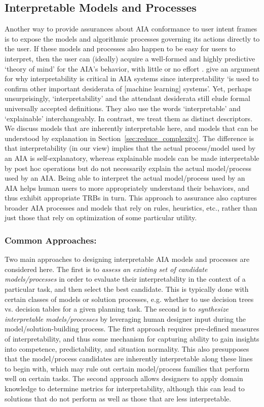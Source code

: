 \subsection{Interpretable Models and Processes} \label{sec:interp_models}
Another way to provide assurances about AIA conformance to user intent frames is to expose the models and algorithmic processes governing its actions directly to the user. If these models and processes also happen to be easy for users to interpret, then the user can (ideally) acquire a well-formed and highly predictive `theory of mind' for the AIA's behavior, with little or no effort . 
\citet{Doshi-Velez2017-xy} give an argument for why interpretability is critical in AIA systems since interpretability `is used to confirm other important desiderata of [machine learning] systems'. 
Yet, perhaps unsurprisingly, `interpretability' and the attendant desiderata still elude formal universally accepted definitions. 
They also use the words `interpretable' and `explainable' interchangeably. In contrast, we treat them as distinct descriptors. We discuss models that are inherently interpretable here, and models that can be understood by explanation in Section~\ref{sec:reduce_complexity}.  The difference is that interpretability (in our view) implies that the actual process/model used by an AIA is self-explanatory, whereas explainable models can be made interpretable by post hoc operations but do not necessarily explain the actual model/process used by an AIA. 
Being able to interpret the actual model/process used by an AIA helps human users to more appropriately understand their behaviors, and thus exhibit appropriate TRBs in turn. This approach to assurance also captures broader AIA processes and models that rely on rules, heuristics, etc., rather than just those that rely on optimization of some particular utility. 

\subsubsection{Common Approaches:}
Two main approaches to designing interpretable AIA models and processes are considered here. 
The first is to \emph{assess an existing set of candidate models/processes} in order to evaluate their interpretability in the context of a particular task, and then select the best candidate. 
This is typically done with certain classes of models or solution processes, e.g. whether to use decision trees vs. decision tables for a given planning task. 
The second is to \emph{synthesize interpretable models/processes} by leveraging human designer input during the model/solution-building process. 
The first approach requires pre-defined measures of interpretability, and thus some mechanism for capturing ability to gain insights into competence, predictability, and situation normality. This also presupposes that the model/process candidates are inherently interpretable along these lines to begin with, which may rule out certain model/process families that perform well on certain tasks. 
The second approach allows designers to apply domain knowledge to determine metrics for interpretability, although this can lead to solutions that do not perform as well as those that are less interpretable. 

